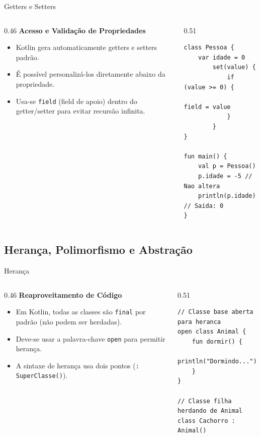 \documentclass[aspectratio=169]{beamer}
\begin{document}
\begin{frame}[fragile]{Getters e Setters}
  \begin{columns}[T]
    \begin{column}{0.46\textwidth}
      \textbf{Acesso e Validação de Propriedades}
      \vspace{0.3em}
      \begin{itemize}\small
        \item Kotlin gera automaticamente getters e setters padrão.
        \item É possível personalizá-los diretamente abaixo da propriedade.
        \item Usa-se \texttt{field} (field de apoio) dentro do getter/setter para evitar recursão infinita.
      \end{itemize}
    \end{column}
    \begin{column}{0.51\textwidth}
\begin{lstlisting}[style=KotlinStyle]
class Pessoa {
    var idade = 0
        set(value) {
            if (value >= 0) {
                field = value
            }
        }
}

fun main() {
    val p = Pessoa()
    p.idade = -5 // Nao altera
    println(p.idade) // Saida: 0
}
\end{lstlisting}
    \end{column}
  \end{columns}
\end{frame}

\subsection{Herança, Polimorfismo e Abstração}

\begin{frame}[fragile]{Herança}
  \begin{columns}[T]
    \begin{column}{0.46\textwidth}
      \textbf{Reaproveitamento de Código}
      \vspace{0.3em}
      \begin{itemize}\small
        \item Em Kotlin, todas as classes são \texttt{final} por padrão (não podem ser herdadas).
        \item Deve-se usar a palavra-chave \texttt{open} para permitir herança.
        \item A sintaxe de herança usa dois pontos (\texttt{: SuperClasse()}).
      \end{itemize}
    \end{column}
    \begin{column}{0.51\textwidth}
\begin{lstlisting}[style=KotlinStyle]
// Classe base aberta para heranca
open class Animal {
    fun dormir() {
        println("Dormindo...")
    }
}

// Classe filha herdando de Animal
class Cachorro : Animal()
\end{lstlisting}
    \end{column}
  \end{columns}
\end{frame}
\end{document}
